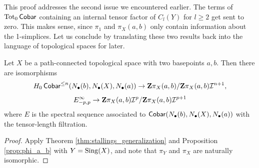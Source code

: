 This proof addresses the second issue we encountered earlier. The terms of $\operatorname{Tot}_0\operatorname{\mathsf{Cobar}}$ containing an internal tensor factor of $C_l(Y)$ for $l\geq 2$ get sent to zero. This makes sense, since $\pi_1$ and $\pi_X(a,b)$ only contain information about the 1-simplices. Let us conclude by translating these two results back into the language of topological spaces for later.
\begin{cor}\label{cor:phi_ab}
Let $X$ be a path-connected topological space with two basepoints $a,b$. Then there are isomorphisms
\[H_0\operatorname{\mathsf{Cobar}}^{\leq n}(N_\bullet(b), N_\bullet(X), N_\bullet(a)) \to \mathbf{Z}\pi_X(a,b)/\mathbf{Z}\pi_X(a,b)\mathcal{I}^{n+1},\] 
\[E^{\infty}_{-p,p} \to \mathbf{Z}\pi_X(a,b)\mathcal{I}^{p}/\mathbf{Z}\pi_X(a,b)\mathcal{I}^{p+1}\]
where $E$ is the spectral sequence associated to $\operatorname{\mathsf{Cobar}}(N_\bullet(b), N_\bullet(X), N_\bullet(a))$ with the tensor-length filtration.
\begin{proof}
Apply Theorem \ref{thm:stallings_generalization} and Proposition \ref{prop:phi_a_b} with $Y= \operatorname{Sing}(X)$, and note that $\pi_Y$ and $\pi_X$ are naturally isomorphic.
\end{proof}
\end{cor}




